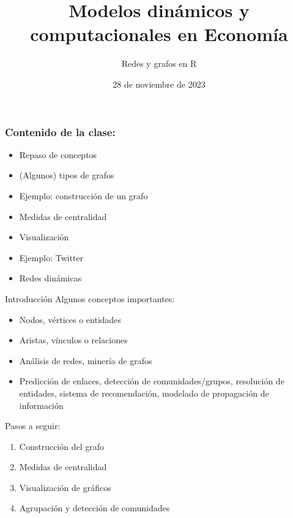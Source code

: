 \documentclass[11pt]{beamer}
\begin{document}
	\title{Modelos dinámicos y computacionales en Economía}
	\subtitle{Redes y grafos en R}
	\date{28 de noviembre de 2023}


\begin{frame}
\frametitle{Contenido de la clase:}
\begin{itemize}
\item Repaso de conceptos
\item (Algunos) tipos de grafos
\item Ejemplo: construcción de un grafo
\item Medidas de centralidad
\item Visualización
\item Ejemplo: Twitter
\item Redes dinámicas
\end{itemize}
\end{frame}

\begin{frame}{Introducción}
Algunos conceptos importantes:
\begin{itemize}
    \item Nodos, vértices o entidades
\item Aristas, vínculos o relaciones
\item  Análisis de redes, minería de grafos
\item Predicción de enlaces, detección de comunidades/grupos, resolución de entidades, sistema de recomendación, modelado de propagación de información
\end{itemize}
Pasos a seguir:
\begin{enumerate}
\item Construcción del grafo
\item  Medidas de centralidad
\item  Visualización de gráficos
\item Agrupación y detección de comunidades
\end{enumerate}
\end{frame}
\end{document}
